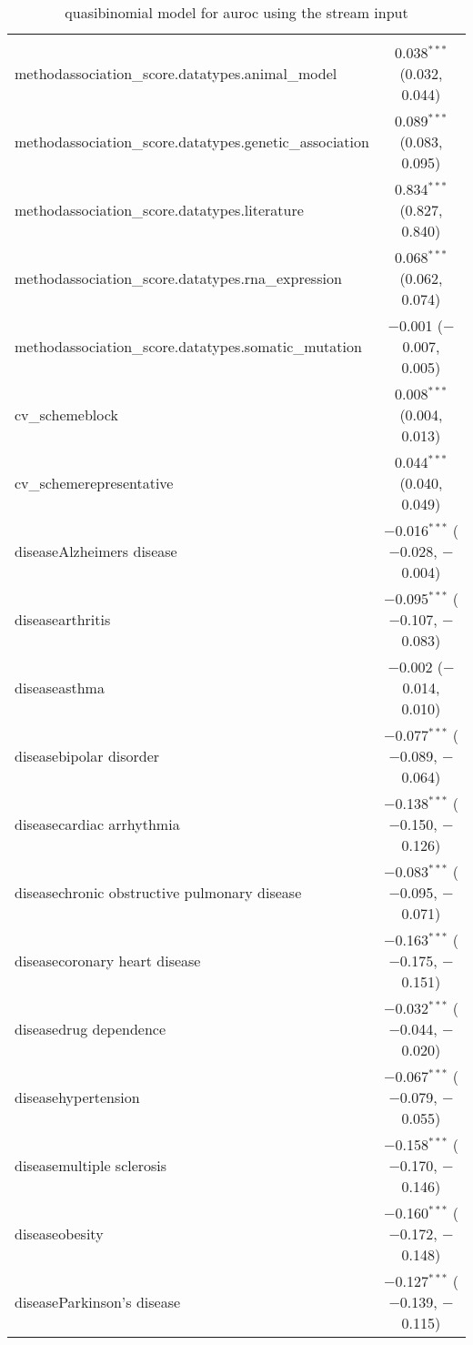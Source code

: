 
\begin{table}[!htbp] \centering 
  \caption{quasibinomial model for auroc using the stream input} 
  \label{} 
\begin{tabular}{@{\extracolsep{5pt}}lc} 
\\[-1.8ex]\hline 
\hline \\[-1.8ex] 
 methodassociation\_score.datatypes.animal\_model & 0.038$^{***}$ (0.032, 0.044) \\ 
  methodassociation\_score.datatypes.genetic\_association & 0.089$^{***}$ (0.083, 0.095) \\ 
  methodassociation\_score.datatypes.literature & 0.834$^{***}$ (0.827, 0.840) \\ 
  methodassociation\_score.datatypes.rna\_expression & 0.068$^{***}$ (0.062, 0.074) \\ 
  methodassociation\_score.datatypes.somatic\_mutation & $-$0.001 ($-$0.007, 0.005) \\ 
  cv\_schemeblock & 0.008$^{***}$ (0.004, 0.013) \\ 
  cv\_schemerepresentative & 0.044$^{***}$ (0.040, 0.049) \\ 
  diseaseAlzheimers disease & $-$0.016$^{***}$ ($-$0.028, $-$0.004) \\ 
  diseasearthritis & $-$0.095$^{***}$ ($-$0.107, $-$0.083) \\ 
  diseaseasthma & $-$0.002 ($-$0.014, 0.010) \\ 
  diseasebipolar disorder & $-$0.077$^{***}$ ($-$0.089, $-$0.064) \\ 
  diseasecardiac arrhythmia & $-$0.138$^{***}$ ($-$0.150, $-$0.126) \\ 
  diseasechronic obstructive pulmonary disease & $-$0.083$^{***}$ ($-$0.095, $-$0.071) \\ 
  diseasecoronary heart disease & $-$0.163$^{***}$ ($-$0.175, $-$0.151) \\ 
  diseasedrug dependence & $-$0.032$^{***}$ ($-$0.044, $-$0.020) \\ 
  diseasehypertension & $-$0.067$^{***}$ ($-$0.079, $-$0.055) \\ 
  diseasemultiple sclerosis & $-$0.158$^{***}$ ($-$0.170, $-$0.146) \\ 
  diseaseobesity & $-$0.160$^{***}$ ($-$0.172, $-$0.148) \\ 
  diseaseParkinson's disease & $-$0.127$^{***}$ ($-$0.139, $-$0.115) \\ 

\end{tabular}
\end{table}
